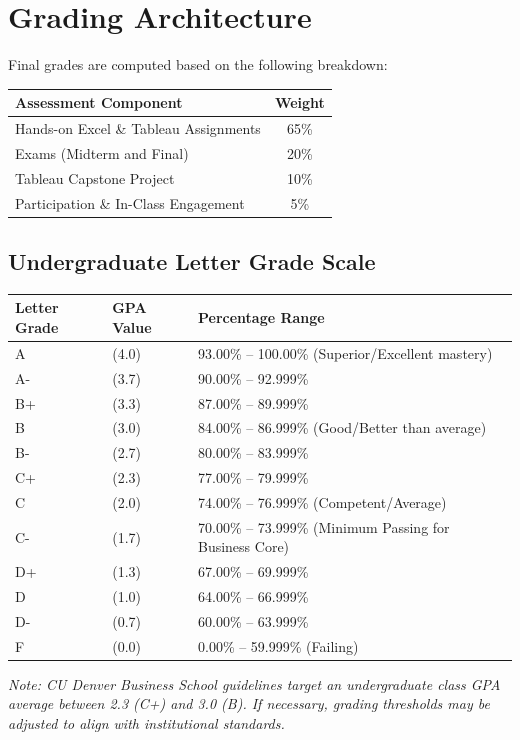 \documentclass[11pt,a4paper]{article}
\begin{document}
\section*{Grading Architecture}
Final grades are computed based on the following breakdown:
\begin{center}
    \begin{tabular}{lc}
        \toprule
        \textbf{Assessment Component} & \textbf{Weight} \\
        \midrule
        Hands-on Excel \& Tableau Assignments & 65\% \\
        Exams (Midterm and Final) & 20\% \\
        Tableau Capstone Project & 10\% \\
        Participation \& In-Class Engagement & 5\% \\
        \bottomrule
    \end{tabular}
\end{center}

\subsection*{Undergraduate Letter Grade Scale}
\begin{center}
    \begin{tabular}{llp{7.5cm}}
        \toprule
        \textbf{Letter Grade} & \textbf{GPA Value} & \textbf{Percentage Range} \\
        \midrule
        A  & (4.0) & 93.00\% -- 100.00\% (Superior/Excellent mastery) \\
        A- & (3.7) & 90.00\% -- 92.999\% \\
        B+ & (3.3) & 87.00\% -- 89.999\% \\
        B  & (3.0) & 84.00\% -- 86.999\% (Good/Better than average) \\
        B- & (2.7) & 80.00\% -- 83.999\% \\
        C+ & (2.3) & 77.00\% -- 79.999\% \\
        C  & (2.0) & 74.00\% -- 76.999\% (Competent/Average) \\
        C- & (1.7) & 70.00\% -- 73.999\% (Minimum Passing for Business Core) \\
        D+ & (1.3) & 67.00\% -- 69.999\% \\
        D  & (1.0) & 64.00\% -- 66.999\% \\
        D- & (0.7) & 60.00\% -- 63.999\% \\
        F  & (0.0) & 0.00\% -- 59.999\% (Failing) \\
        \bottomrule
    \end{tabular}
\end{center}
\textit{Note: CU Denver Business School guidelines target an undergraduate class GPA average between 2.3 (C+) and 3.0 (B). If necessary, grading thresholds may be adjusted to align with institutional standards.}
\end{document}
